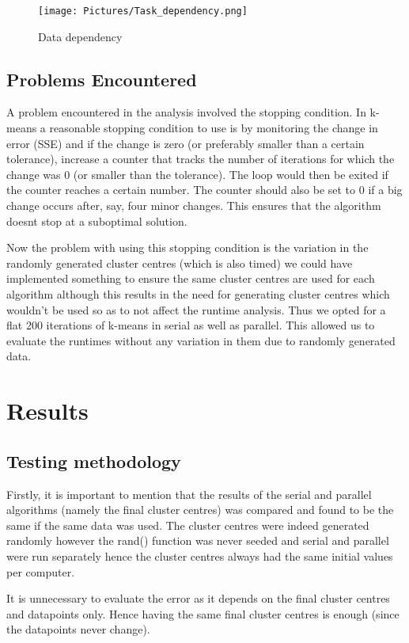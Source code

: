 \documentclass{article}
\begin{document}
\begin{figure}[h!]
	\texttt{[image: Pictures/Task\_dependency.png]}
	\caption{Data dependency}
\end{figure}

\newpage
\subsection{Problems Encountered}
A problem encountered in the analysis involved the stopping condition. In k-means a reasonable stopping condition to use is by monitoring the change in error (SSE) and if the change is zero (or preferably smaller than a certain tolerance), increase a counter that tracks the number of iterations for which the change was 0 (or smaller than the tolerance). The loop would then be exited if the counter reaches a certain number. The counter should also be set to 0 if a big change occurs after, say, four minor changes. This ensures that the algorithm doesnt stop at a suboptimal solution.

Now the problem with using this stopping condition is the variation in the randomly generated cluster centres (which is also timed) we could have implemented something to ensure the same cluster centres are used for each algorithm although this results in the need for generating cluster centres which wouldn't be used so as to not affect the runtime analysis. Thus we opted for a flat 200 iterations of k-means in serial as well as parallel. This allowed us to evaluate the runtimes without any variation in them due to randomly generated data.

\newpage
\section{Results}
\subsection{Testing methodology}
Firstly, it is important to mention that the results of the serial and parallel algorithms (namely the final cluster centres) was compared and found to be the same if the same data was used. The cluster centres were indeed generated randomly however the rand() function was never seeded and serial and parallel were run separately hence the cluster centres always had the same initial values per computer.

It is unnecessary to evaluate the error as it depends on the final cluster centres and datapoints only. Hence having the same final cluster centres is enough (since the datapoints never change).
\end{document}
